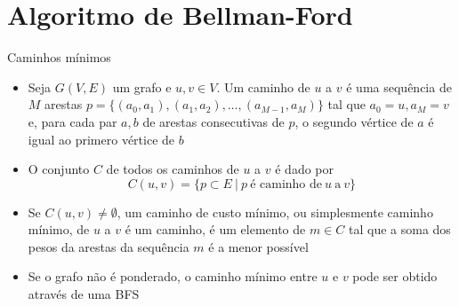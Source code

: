 \section{Algoritmo de Bellman-Ford}

\begin{frame}[fragile]{Caminhos mínimos}

    \begin{itemize}
        \item Seja $G(V, E)$ um grafo e $u, v\in V$. Um caminho de $u$ a $v$ é uma sequência de
            $M$ arestas $p = \lbrace (a_0, a_1), (a_1, a_2), \ldots, (a_{M-1}, a_M)\rbrace$ tal que
            $a_0 = u, a_M = v$ e, para cada par $a, b$ de arestas consecutivas de $p$, o 
            segundo vértice de $a$ é igual ao primero vértice de $b$

        \item O conjunto $C$ de todos os caminhos de $u$ a $v$ é dado por
        \[
            C(u, v) = \lbrace p\subset E\ |\ p\ \mbox{é caminho de}\ u\ \mbox{a}\ v\rbrace
        \]

        \item Se $C(u, v)\neq \emptyset$, um caminho de custo mínimo, ou simplesmente caminho 
        mínimo, de 
        $u$ a $v$ é um caminho, é um elemento de $m\in C$ tal que a soma dos pesos da arestas 
        da sequência $m$ é a menor possível

        \item Se o grafo não é ponderado, o caminho mínimo entre $u$ e $v$ pode ser obtido
            através de uma BFS
    \end{itemize}

\end{frame}

